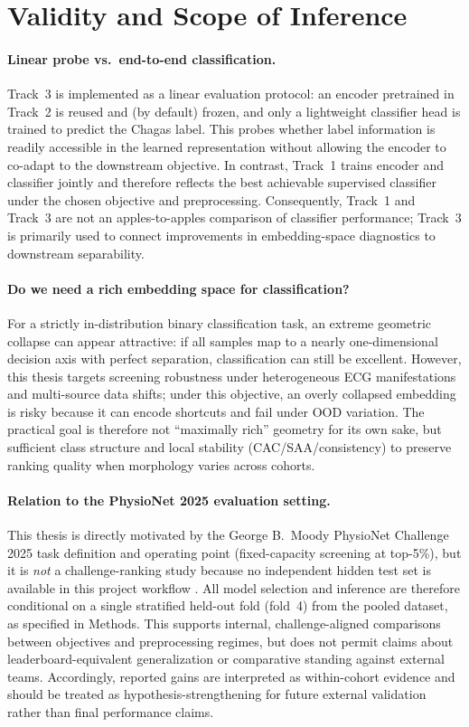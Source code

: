 \section{Validity and Scope of Inference}

\paragraph{Linear probe vs.\ end-to-end classification.}
Track~3 is implemented as a linear evaluation protocol: an encoder pretrained in Track~2 is reused and (by default) frozen, and only a lightweight classifier head is trained to predict the Chagas label.
This probes whether label information is readily accessible in the learned representation without allowing the encoder to co-adapt to the downstream objective.
In contrast, Track~1 trains encoder and classifier jointly and therefore reflects the best achievable supervised classifier under the chosen objective and preprocessing.
Consequently, Track~1 and Track~3 are not an apples-to-apples comparison of classifier performance; Track~3 is primarily used to connect improvements in embedding-space diagnostics to downstream separability.

\paragraph{Do we need a rich embedding space for classification?}
For a strictly in-distribution binary classification task, an extreme geometric collapse can appear attractive: if all samples map to a nearly one-dimensional decision axis with perfect separation, classification can still be excellent.
However, this thesis targets screening robustness under heterogeneous ECG manifestations and multi-source data shifts; under this objective, an overly collapsed embedding is risky because it can encode shortcuts and fail under OOD variation.
The practical goal is therefore not ``maximally rich'' geometry for its own sake, but sufficient class structure and local stability (CAC/SAA/consistency) to preserve ranking quality when morphology varies across cohorts.

\paragraph{Relation to the PhysioNet 2025 evaluation setting.}
This thesis is directly motivated by the George B.~Moody PhysioNet Challenge 2025 task definition and operating point (fixed-capacity screening at top-5\%), but it is \emph{not} a challenge-ranking study because no independent hidden test set is available in this project workflow \parencite{2025ChallengePreprint,2025ChallengeCinC}.
All model selection and inference are therefore conditional on a single stratified held-out fold (fold~4) from the pooled dataset, as specified in Methods.
This supports internal, challenge-aligned comparisons between objectives and preprocessing regimes, but does not permit claims about leaderboard-equivalent generalization or comparative standing against external teams.
Accordingly, reported gains are interpreted as within-cohort evidence and should be treated as hypothesis-strengthening for future external validation rather than final performance claims.

